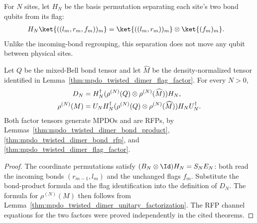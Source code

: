 \begin{definition}%
    \label{def:mpdo_twisted_dimer_onsite_split}
    \leanok
    For $N$ sites, let $H_N$ be the basis permutation separating each
    site's two bond qubits from its flag:
    \begin{align}
        H_N\ket{((l_m,r_m,f_m))_m}
         & =\ket{((l_m,r_m))_m}\otimes\ket{(f_m)_m}.
        \notag
    \end{align}
    Unlike the incoming-bond regrouping, this separation does not move
    any qubit between physical sites.
\end{definition}

\begin{lemma}%
    \label{thm:mpdo_twisted_dimer_rfp_factor_attachment}
    \leanok
    Let $Q$ be the mixed-Bell bond tensor and let $\widehat M$ be the
    density-normalized tensor identified in
    Lemma~\ref{thm:mpdo_twisted_dimer_flag_factor}. For every $N>0$,
    \begin{align}
        D_N           & =H_N^\dagger
        (\rho^{(N)}(Q)\otimes\rho^{(N)}(\widehat M))H_N,
        \notag                          \\
        \rho^{(N)}(M) & =U_NH_N^\dagger
        (\rho^{(N)}(Q)\otimes\rho^{(N)}(\widehat M))
        H_NU_N^\dagger.
        \notag
    \end{align}
    Both factor tensors generate MPDOs and are RFPs, by
    Lemmas~\ref{thm:mpdo_twisted_dimer_bond_product},
    \ref{thm:mpdo_twisted_dimer_bond_rfp}, and
    \ref{thm:mpdo_twisted_dimer_flag_factor}.
\end{lemma}
\begin{proof}\leanok
    The coordinate permutations satisfy
    $(B_N\otimes\Id)H_N=S_NE_N$: both read the incoming bonds
    $(r_{m-1},l_m)$ and the unchanged flags $f_m$.
    Substitute the bond-product formula and the flag identification
    into the definition of $D_N$. The formula for $\rho^{(N)}(M)$ then
    follows from Lemma~\ref{thm:mpdo_twisted_dimer_unitary_factorization}.
    The RFP channel equations for the two factors were proved independently
    in the cited theorems.
\end{proof}

